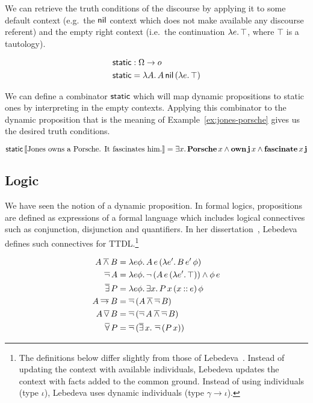 We can retrieve the truth conditions of the discourse by applying it to
some default context (e.g.\ the $\textsf{nil}$ context which does not make
available any discourse referent) and the empty right context (i.e.\ the
continuation $\lambda e.\, \top$, where $\top$ is a tautology).

\begin{align*}
\textsf{static} &: \Omega \to o \\
\textsf{static} &= \lambda A.\, A\,\textsf{nil}\,(\lambda e.\, \top)
\end{align*}

We can define a combinator $\textsf{static}$ which will map dynamic propositions to
static ones by interpreting in the empty contexts. Applying this combinator
to the dynamic proposition that is the meaning of
Example~\ref{ex:jones-porsche} gives us the desired truth conditions.

$$
\textsf{static}\,\llbracket \text{Jones owns a Porsche. It fascinates him.} \rrbracket
= \exists x.\, \textbf{Porsche}\,x \land
  \textbf{own}\,\textbf{j}\,x \land \textbf{fascinate}\,x\,\textbf{j}
$$


\subsection{Logic}
\label{ssec:ttdl-logic}

We have seen the notion of a dynamic proposition. In formal logics,
propositions are defined as expressions of a formal language which includes
logical connectives such as conjunction, disjunction and quantifiers. In
her dissertation~\cite{lebedeva2012expression}, Lebedeva defines such
connectives for TTDL.\footnote{The definitions below differ slightly from
  those of Lebedeva~\cite{lebedeva2012expression}. Instead of updating the
  context with available individuals, Lebedeva updates the context with
  facts added to the common ground. Instead of using individuals (type
  $\iota$), Lebedeva uses dynamic individuals (type $\gamma \to \iota$).}

\begin{align*}
  A \mathbin{\overline{\land}} B &= \lambda e \phi.\, A\,e\,(\lambda e'.\, B\,e'\,\phi) \\
  \mathop{\overline{\lnot}} A &= \lambda e \phi.\, \lnot\,(A\,e\,(\lambda e'.\, \top)) \land \phi\,e \\
  \mathop{\overline{\exists}} P &= \lambda e \phi.\, \exists x.\, P\,x\,(x \mathbin{::} e)\,\phi \\
  A \mathbin{\overline{\to}} B &= \mathop{\overline{\lnot}}\,(A \mathbin{\overline{\land}} \mathop{\overline{\lnot}} B) \\
  A \mathop{\overline{\lor}} B &= \mathop{\overline{\lnot}}\,(\mathop{\overline{\lnot}} A \mathbin{\overline{\land}} \mathop{\overline{\lnot}} B) \\
  \mathop{\overline{\forall}} P &= \mathop{\overline{\lnot}}\,(\mathop{\overline{\exists}} x.\, \mathop{\overline{\lnot}}\,(P\,x))
\end{align*}

